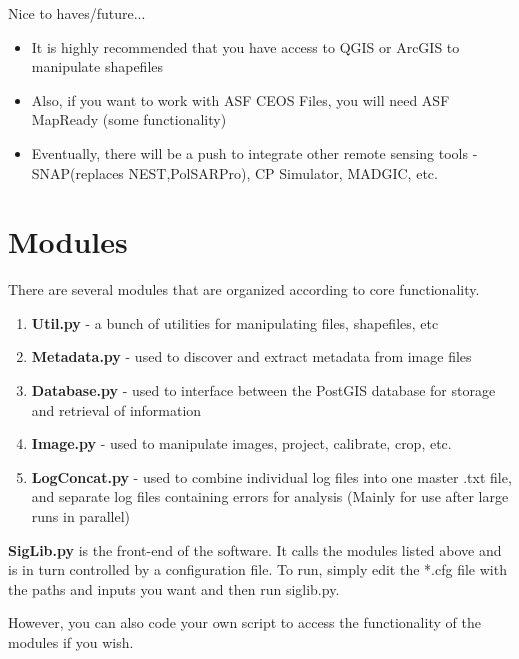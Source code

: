 \documentclass[letterpaper,10pt,openany,oneside]{sphinxmanual}
\begin{document}
Nice to haves/future...
\begin{itemize}
\item {} 
It is highly recommended that you have access to QGIS or ArcGIS to
manipulate shapefiles

\item {} 
Also, if you want to work with ASF CEOS Files, you will need ASF
MapReady (some functionality)

\item {} 
Eventually, there will be a push to integrate other remote sensing
tools - SNAP(replaces NEST,PolSARPro), CP Simulator, MADGIC, etc.

\end{itemize}


\section{Modules}
\label{project:modules}
There are several modules that are organized according to core
functionality.
\begin{enumerate}
\item {} 
\textbf{Util.py} - a bunch of utilities for manipulating files,
shapefiles, etc

\item {} 
\textbf{Metadata.py} - used to discover and extract metadata from image
files

\item {} 
\textbf{Database.py} - used to interface between the PostGIS database for
storage and retrieval of information

\item {} 
\textbf{Image.py} - used to manipulate images, project, calibrate, crop,
etc.

\item {} 
\textbf{LogConcat.py} - used to combine individual log files into one
master .txt file, and separate log files containing errors for
analysis (Mainly for use after large runs in parallel)

\end{enumerate}

\textbf{SigLib.py} is the front-end of the software. It calls the modules
listed above and is in turn controlled by a configuration file. To run,
simply edit the *.cfg file with the paths and inputs you want and then
run siglib.py.

However, you can also code your own script to access the functionality
of the modules if you wish.
\end{document}
